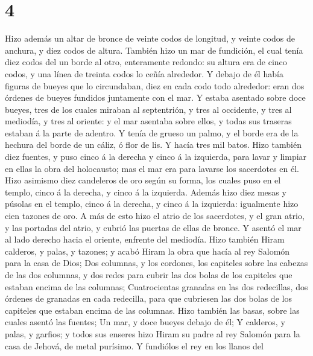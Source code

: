 \hypertarget{section-3}{%
\section{4}\label{section-3}}

 Hizo además un altar de bronce de veinte codos de longitud,
y veinte codos de anchura, y diez codos de altura.  También
hizo un mar de fundición, el cual tenía diez codos del un borde al otro,
enteramente redondo: su altura era de cinco codos, y una línea de
treinta codos lo ceñía alrededor.  Y debajo de él había
figuras de bueyes que lo circundaban, diez en cada codo todo alrededor:
eran dos órdenes de bueyes fundidos juntamente con el mar. 
Y estaba asentado sobre doce bueyes, tres de los cuales miraban al
septentrión, y tres al occidente, y tres al mediodía, y tres al oriente:
y el mar asentaba sobre ellos, y todas sus traseras estaban á la parte
de adentro.  Y tenía de grueso un palmo, y el borde era de
la hechura del borde de un cáliz, ó flor de lis. Y hacía tres mil batos.
 Hizo también diez fuentes, y puso cinco á la derecha y
cinco á la izquierda, para lavar y limpiar en ellas la obra del
holocausto; mas el mar era para lavarse los sacerdotes en él.
 Hizo asimismo diez candeleros de oro según su forma, los
cuales puso en el templo, cinco á la derecha, y cinco á la izquierda.
 Además hizo diez mesas y púsolas en el templo, cinco á la
derecha, y cinco á la izquierda: igualmente hizo cien tazones de oro.
 A más de esto hizo el atrio de los sacerdotes, y el gran
atrio, y las portadas del atrio, y cubrió las puertas de ellas de
bronce.  Y asentó el mar al lado derecho hacia el oriente,
enfrente del mediodía.  Hizo también Hiram calderos, y
palas, y tazones; y acabó Hiram la obra que hacía al rey Salomón para la
casa de Dios;  Dos columnas, y los cordones, los capiteles
sobre las cabezas de las dos columnas, y dos redes para cubrir las dos
bolas de los capiteles que estaban encima de las columnas; 
Cuatrocientas granadas en las dos redecillas, dos órdenes de granadas en
cada redecilla, para que cubriesen las dos bolas de los capiteles que
estaban encima de las columnas.  Hizo también las basas,
sobre las cuales asentó las fuentes;  Un mar, y doce bueyes
debajo de él;  Y calderos, y palas, y garfios; y todos sus
enseres hizo Hiram su padre al rey Salomón para la casa de Jehová, de
metal purísimo.  Y fundiólos el rey en los llanos del
